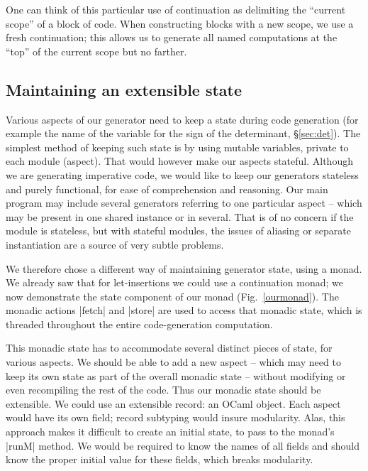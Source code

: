 \documentclass{elsart}
\begin{document}
One can think of this particular use of continuation as delimiting the 
``current scope'' of a block of code.  When constructing blocks
with a new scope, we use a fresh continuation; this allows us to generate
all named computations at the ``top'' of the current scope but no farther.

\subsection{Maintaining an extensible state}\label{ssec:state}

Various aspects of our generator need to keep a state during
code generation (for example the name of the variable for the sign of
the determinant, \S\ref{sec:det}).
The simplest method of keeping such state is by using
mutable variables, private to each module (aspect). That would however
make our aspects stateful. Although we are generating imperative code,
we would like to keep our generators stateless and purely functional,
for ease of comprehension and reasoning.  Our main program may include
several generators referring to one particular aspect -- which may be
present in one shared instance or in several. That is of no concern if
the module is stateless, but with stateful modules, the issues of
aliasing or separate instantiation are a source of very subtle
problems.

We therefore chose a different way of maintaining generator state,
using a monad. We already saw that for let-insertions we could use
a continuation monad;  we now demonstrate the state component
of our monad (Fig.~\ref{ourmonad}). The monadic actions |fetch| and
|store| are used to access that monadic state, which is
threaded throughout the entire code-generation computation. 

This monadic state has to accommodate several distinct pieces of state, for
various aspects. We should be able to add a new aspect -- which may need
to keep its own state as part of the overall monadic state -- without
modifying or even recompiling the rest of the code. Thus our monadic
state should be extensible. We could use an extensible
record: an OCaml object. Each aspect would have its own field; record
subtyping would insure modularity. Alas, this approach makes it
difficult to create an initial state, to pass to the monad's |runM|
method. We would be required to know the names of all fields and should know
the proper initial value for these fields, which breaks modularity.
\end{document}
